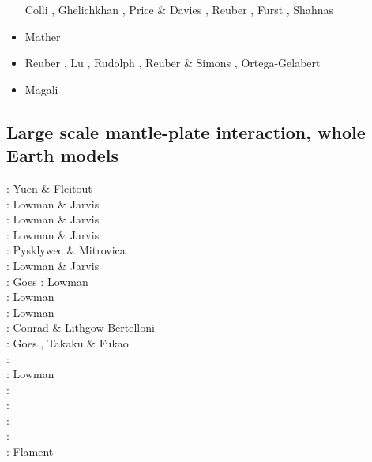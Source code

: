 \begin{scriptsize}
\begin{itemize}
                            Colli \etal \cite{cogb18}, Ghelichkhan \etal \cite{ghmc18},
                            Price \& Davies \cite{prda18}, Reuber \etal \cite{repk18},
                            Furst \etal \cite{fupc18}, Shahnas \etal \cite{shyp18}
\item[\twothousandnineteen] Mather \etal \cite{mamr19} 
\item[\twothousandtwenty] Reuber \etal \cite{rehp20}, Lu \etal{} \cite{lufs20},
                          Rudolph \etal \cite{ruml20}, Reuber \& Simons \cite{resi20},
                          Ortega-Gelabert \etal \cite{orza20}
\item[\twothousandtwentyone] Magali \etal \cite{mabh21}
\end{itemize}
\end{scriptsize}

\subsection{Large scale mantle-plate interaction, whole Earth models}

\begin{scriptsize}
\nineteeneightyfive: Yuen \& Fleitout \cite{yufl85}\\
\nineteenninetythree: Lowman \& Jarvis \cite{loja93}\\
\nineteenninetyfive: Lowman \& Jarvis \cite{loja95}\\
\nineteenninetysix: Lowman \& Jarvis \cite{loja96}\\
\nineteenninetyeight: Pysklywec \& Mitrovica \cite{pymi98}\\
\nineteenninetynine: Lowman \& Jarvis \cite{loja99}\\
\twothousand: Goes \etal \cite{golw00}
\twothousandone: Lowman \etal \cite{lokg01} \\
\twothousandthree: Lowman \etal \cite{lokg03} \\
\twothousandfour: Lowman \etal \cite{lokg04} \\
\twothousandsix: Conrad \& Lithgow-Bertelloni \cite{coli06}\\
\twothousandeight: Goes \etal \cite{gocm08}, Takaku \& Fukao \cite{tafu08}\\
\twothousandten: \cite{wamg10}\cite{stgb10}\cite{cobe10}\\
\twothousandeleven: Lowman \etal \cite{lokt11}\\
\twothousandtwelve: \cite{algs12}\cite{roct12}\cite{crtm12}\\
\twothousandthirteen: \cite{ghbh13}\cite{yahb13}\\
\twothousandsixteen: \cite{macs16}\\
\twothousandeighteen: \cite{hulz18}\cite{osss18b}\\
\twothousandnineteen: Flament \cite{flam19}
\end{scriptsize}


